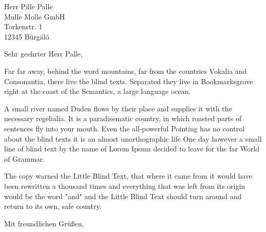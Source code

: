 \documentclass[
    absender,
    paper=a4,
    version=last,
    fontsize=11pt,
    DIV=13,
    BCOR=0mm]{scrlttr2}
\begin{document}


\begin{letter}{
    Herr Pille Palle\\
    Mulle Molle GmbH\\
    Torkenstr. 1\\
    12345 Bürgälö
}
\opening{Sehr geehrter Herr Palle,}

Far far away, behind the word mountains, far from the countries Vokalia and Consonantia, there live the blind texts. Separated they live in Bookmarksgrove right at the coast of the Semantics, a large language ocean.

A small river named Duden flows by their place and supplies it with the necessary regelialia. It is a paradisematic country, in which roasted parts of sentences fly into your mouth. Even the all-powerful Pointing has no control about the blind texts it is an almost unorthographic life One day however a small line of blind text by the name of Lorem Ipsum decided to leave for the far World of Grammar.

The copy warned the Little Blind Text, that where it came from it would have been rewritten a thousand times and everything that was left from its origin would be the word "and" and the Little Blind Text should turn around and return to its own, safe country.

\closing{Mit freundlichen Grüßen,}
\end{letter}
\end{document}
